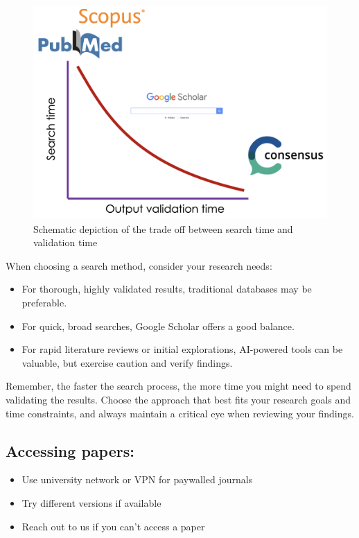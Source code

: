 \documentclass[
  letterpaper,
  DIV=11,
  numbers=noendperiod]{scrreprt}
\providecommand{\tightlist}{%
  \setlength{\itemsep}{0pt}\setlength{\parskip}{0pt}}\usepackage{longtable,booktabs,array}
\begin{document}
\begin{figure}[H]

{\centering \includegraphics{_images/search_engines.png}

}

\caption{Schematic depiction of the trade off between search time and
validation time}

\end{figure}%

When choosing a search method, consider your research needs:

\begin{itemize}
\tightlist
\item
  For thorough, highly validated results, traditional databases may be
  preferable.
\item
  For quick, broad searches, Google Scholar offers a good balance.
\item
  For rapid literature reviews or initial explorations, AI-powered tools
  can be valuable, but exercise caution and verify findings.
\end{itemize}

Remember, the faster the search process, the more time you might need to
spend validating the results. Choose the approach that best fits your
research goals and time constraints, and always maintain a critical eye
when reviewing your findings.

\subsection{Accessing papers:}\label{accessing-papers}

\begin{itemize}
\tightlist
\item
  Use university network or VPN for paywalled journals
\item
  Try different versions if available
\item
  Reach out to us if you can't access a paper
\end{itemize}
\end{document}
